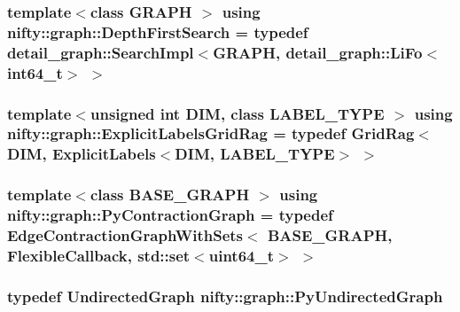 \subsubsection[{Depth\+First\+Search}]{\setlength{\rightskip}{0pt plus 5cm}template$<$class G\+R\+A\+P\+H $>$ using {\bf nifty\+::graph\+::\+Depth\+First\+Search} = typedef {\bf detail\+\_\+graph\+::\+Search\+Impl}$<$G\+R\+A\+P\+H, {\bf detail\+\_\+graph\+::\+Li\+Fo}$<$int64\+\_\+t$>$ $>$}\label{namespacenifty_1_1graph_a3d6d4a5216a5d0a11785373bc7537085}
\hypertarget{namespacenifty_1_1graph_a45cca2dcd061996d13ec8e6bb8afb200}{}
\subsubsection[{Explicit\+Labels\+Grid\+Rag}]{\setlength{\rightskip}{0pt plus 5cm}template$<$unsigned int D\+I\+M, class L\+A\+B\+E\+L\+\_\+\+T\+Y\+P\+E $>$ using {\bf nifty\+::graph\+::\+Explicit\+Labels\+Grid\+Rag} = typedef {\bf Grid\+Rag}$<$D\+I\+M, {\bf Explicit\+Labels}$<$D\+I\+M, L\+A\+B\+E\+L\+\_\+\+T\+Y\+P\+E$>$ $>$}\label{namespacenifty_1_1graph_a45cca2dcd061996d13ec8e6bb8afb200}
\hypertarget{namespacenifty_1_1graph_aa9ab054f2ea0df09d60d6adf1c7ee6b3}{}
\subsubsection[{Py\+Contraction\+Graph}]{\setlength{\rightskip}{0pt plus 5cm}template$<$class B\+A\+S\+E\+\_\+\+G\+R\+A\+P\+H $>$ using {\bf nifty\+::graph\+::\+Py\+Contraction\+Graph} = typedef {\bf Edge\+Contraction\+Graph\+With\+Sets}$<$ B\+A\+S\+E\+\_\+\+G\+R\+A\+P\+H, {\bf Flexible\+Callback}, std\+::set$<$uint64\+\_\+t$>$ $>$}\label{namespacenifty_1_1graph_aa9ab054f2ea0df09d60d6adf1c7ee6b3}
\hypertarget{namespacenifty_1_1graph_a62ff5304d118f627910196adc6ab7aab}{}
\subsubsection[{Py\+Undirected\+Graph}]{\setlength{\rightskip}{0pt plus 5cm}typedef {\bf Undirected\+Graph} {\bf nifty\+::graph\+::\+Py\+Undirected\+Graph}}\label{namespacenifty_1_1graph_a62ff5304d118f627910196adc6ab7aab}


